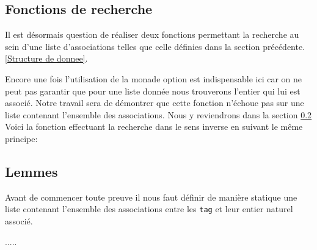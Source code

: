 \documentclass {article}
\newcommand{\codefrom}[3]
           {}
\theoremstyle{definition}
\theoremstyle{remark}
\newcommand{\fun}[1]{\lstinline!#1!}
\begin{document}
\codefrom{src}{association_list}{tag_opcode_assoc}



\subsection{Fonctions de recherche}

Il est désormais question de réaliser deux fonctions permettant la recherche
au sein d'une liste d'associations telles  que celle définies dans la section précédente.
\ref{Structure de donnee}.

\codefrom{src}{association_list}{lookup}

Encore une fois l'utilisation de la monade option est indispensable ici car
on ne peut pas garantir que pour une liste donnée nous trouverons l'entier
qui lui est associé. Notre travail sera de démontrer que cette fonction n'échoue pas
sur une liste contenant l'ensemble des associations. Nous y reviendrons dans la section
\ref{Lemmeslol}
Voici la fonction effectuant la recherche dans le sens inverse en suivant le même principe:

\codefrom{src}{association_list}{lookdown}



\subsection{Lemmes}
\label{Lemmeslol}

Avant de commencer toute preuve il nous faut définir de manière statique une liste
contenant l'ensemble des associations entre les \fun{tag} et leur entier naturel associé.


\codefrom{src}{association_list}{encdec}
.....\\ \\
\end{document}
